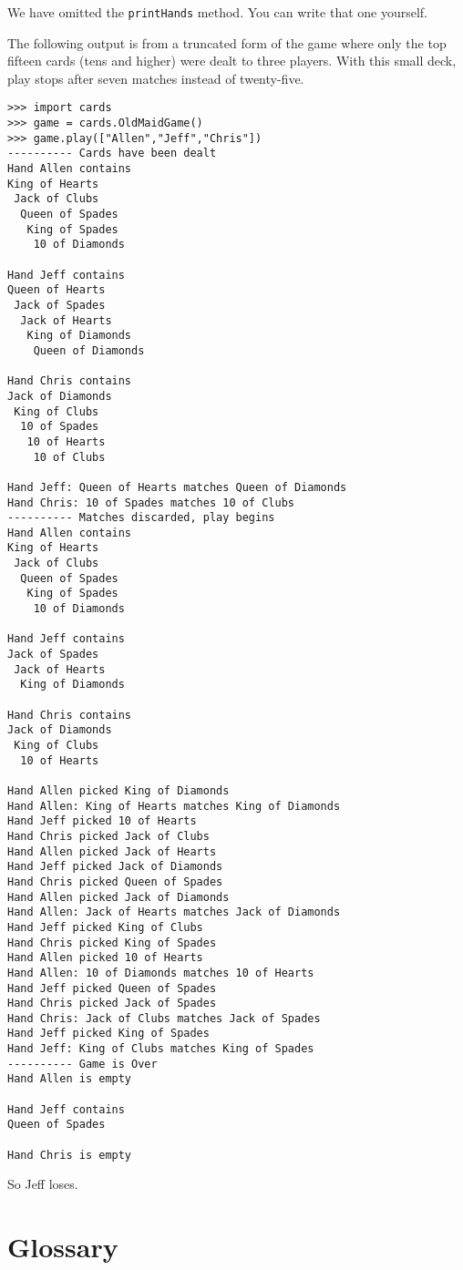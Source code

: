 We have omitted the {\tt printHands} method.  You
can write that one yourself.

The following output is from a truncated form of the game where only
the top fifteen cards (tens and higher) were dealt to three players.
With this small deck, play stops after seven matches instead of
twenty-five.

\beforeverb
\begin{verbatim}
>>> import cards
>>> game = cards.OldMaidGame()
>>> game.play(["Allen","Jeff","Chris"])
---------- Cards have been dealt
Hand Allen contains
King of Hearts
 Jack of Clubs
  Queen of Spades
   King of Spades
    10 of Diamonds

Hand Jeff contains
Queen of Hearts
 Jack of Spades
  Jack of Hearts
   King of Diamonds
    Queen of Diamonds

Hand Chris contains
Jack of Diamonds
 King of Clubs
  10 of Spades
   10 of Hearts
    10 of Clubs

Hand Jeff: Queen of Hearts matches Queen of Diamonds
Hand Chris: 10 of Spades matches 10 of Clubs
---------- Matches discarded, play begins
Hand Allen contains
King of Hearts
 Jack of Clubs
  Queen of Spades
   King of Spades
    10 of Diamonds

Hand Jeff contains
Jack of Spades
 Jack of Hearts
  King of Diamonds

Hand Chris contains
Jack of Diamonds
 King of Clubs
  10 of Hearts

Hand Allen picked King of Diamonds
Hand Allen: King of Hearts matches King of Diamonds
Hand Jeff picked 10 of Hearts
Hand Chris picked Jack of Clubs
Hand Allen picked Jack of Hearts
Hand Jeff picked Jack of Diamonds
Hand Chris picked Queen of Spades
Hand Allen picked Jack of Diamonds
Hand Allen: Jack of Hearts matches Jack of Diamonds
Hand Jeff picked King of Clubs
Hand Chris picked King of Spades
Hand Allen picked 10 of Hearts
Hand Allen: 10 of Diamonds matches 10 of Hearts
Hand Jeff picked Queen of Spades
Hand Chris picked Jack of Spades
Hand Chris: Jack of Clubs matches Jack of Spades
Hand Jeff picked King of Spades
Hand Jeff: King of Clubs matches King of Spades
---------- Game is Over
Hand Allen is empty

Hand Jeff contains
Queen of Spades

Hand Chris is empty

\end{verbatim}
\afterverb
%
So Jeff loses.



\section{Glossary}

